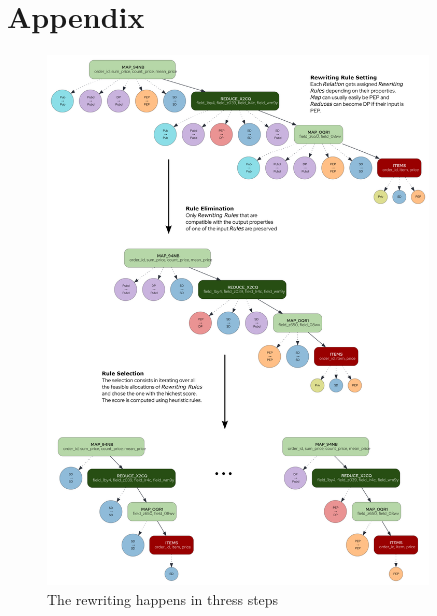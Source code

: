 \documentclass[letterpaper]{article} %
\begin{document}
\section*{Appendix}

\begin{figure}[t]
    \centering
    \includegraphics[width=0.9\textwidth]{figures/set_eliminate_select} %
    \caption{The rewriting happens in thress steps}
    \label{fig:set_eliminate_select}
\end{figure}


\end{document}
